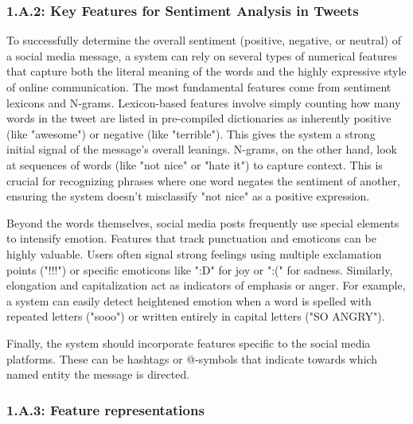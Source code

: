 \documentclass[11pt]{article}
\begin{document}
\subsubsection*{1.A.2: Key Features for Sentiment Analysis in Tweets}

To successfully determine the overall sentiment (positive, negative, or neutral) of a social media message, a system can rely on several types of numerical features that capture both the literal meaning of the words and the highly expressive style of online communication.
The most fundamental features come from sentiment lexicons and N-grams.
Lexicon-based features involve simply counting how many words in the tweet are listed in pre-compiled dictionaries as inherently positive (like "awesome") or negative (like "terrible").
This gives the system a strong initial signal of the message's overall leanings.
N-grams, on the other hand, look at sequences of words (like "not nice" or "hate it") to capture context.
This is crucial for recognizing phrases where one word negates the sentiment of another, ensuring the system doesn't misclassify "not nice" as a positive expression.

Beyond the words themselves, social media posts frequently use special elements to intensify emotion.
Features that track punctuation and emoticons can be highly valuable.
Users often signal strong feelings using multiple exclamation points ("!!!") or specific emoticons like ":D" for joy or ":(" for sadness.
Similarly, elongation and capitalization act as indicators of emphasis or anger.
For example, a system can easily detect heightened emotion when a word is spelled with repeated letters ("sooo") or written entirely in capital letters ("SO ANGRY").

Finally, the system should incorporate features specific to the social media platforms. These can be hashtags or @-symbols that indicate towards which named entity the message is directed.

\subsubsection*{1.A.3: Feature representations}
\end{document}

